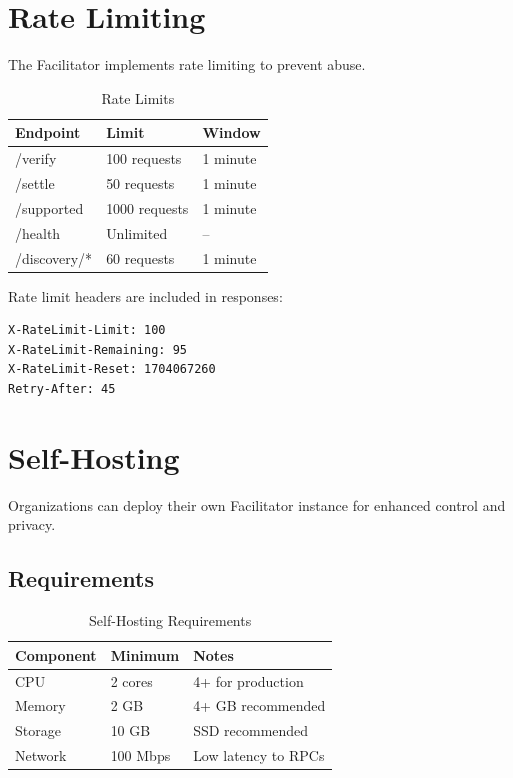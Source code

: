 \section{Rate Limiting}
\label{sec:rate-limiting}

The Facilitator implements rate limiting to prevent abuse.

\begin{table}[htbp]
\centering
\caption{Rate Limits}
\label{tab:rate-limits}
\begin{tabular}{l l l}
\toprule
\textbf{Endpoint} & \textbf{Limit} & \textbf{Window} \\
\midrule
/verify & 100 requests & 1 minute \\
/settle & 50 requests & 1 minute \\
/supported & 1000 requests & 1 minute \\
/health & Unlimited & -- \\
/discovery/* & 60 requests & 1 minute \\
\bottomrule
\end{tabular}
\end{table}

Rate limit headers are included in responses:

\begin{lstlisting}[caption={Rate limit headers}]
X-RateLimit-Limit: 100
X-RateLimit-Remaining: 95
X-RateLimit-Reset: 1704067260
Retry-After: 45
\end{lstlisting}

\section{Self-Hosting}
\label{sec:self-hosting}

Organizations can deploy their own Facilitator instance for enhanced control and privacy.

\subsection{Requirements}

\begin{table}[htbp]
\centering
\caption{Self-Hosting Requirements}
\label{tab:self-hosting-requirements}
\begin{tabular}{l l p{5cm}}
\toprule
\textbf{Component} & \textbf{Minimum} & \textbf{Notes} \\
\midrule
CPU & 2 cores & 4+ for production \\
Memory & 2 GB & 4+ GB recommended \\
Storage & 10 GB & SSD recommended \\
Network & 100 Mbps & Low latency to RPCs \\
\bottomrule
\end{tabular}
\end{table}

